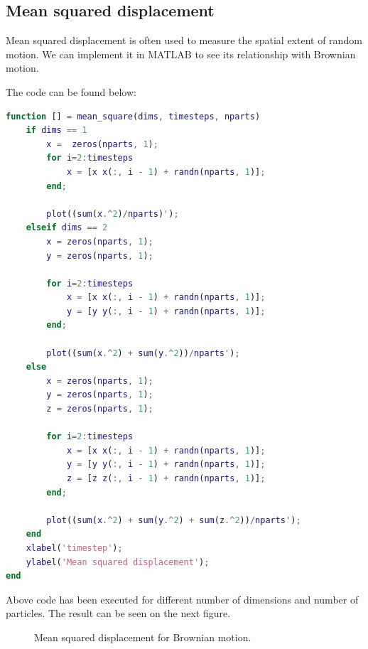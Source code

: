 \documentclass[12pt]{article}
\begin{document}
\subsection{Mean squared displacement}
Mean squared displacement is often used to measure the spatial extent of random motion. We can implement it in MATLAB to see its relationship with Brownian motion.

The code can be found below:

\begin{lstlisting}[language=Matlab, caption = {Source code for Mean squared displacement}]
function [] = mean_square(dims, timesteps, nparts)
	if dims == 1
		x =  zeros(nparts, 1);
		for i=2:timesteps
			x = [x x(:, i - 1) + randn(nparts, 1)];
		end;

		plot((sum(x.^2)/nparts)');
	elseif dims == 2
		x = zeros(nparts, 1);
		y = zeros(nparts, 1);

		for i=2:timesteps
			x = [x x(:, i - 1) + randn(nparts, 1)];
			y = [y y(:, i - 1) + randn(nparts, 1)];
		end;

		plot((sum(x.^2) + sum(y.^2))/nparts');
	else
		x = zeros(nparts, 1);
		y = zeros(nparts, 1);
		z = zeros(nparts, 1);

		for i=2:timesteps
			x = [x x(:, i - 1) + randn(nparts, 1)];
			y = [y y(:, i - 1) + randn(nparts, 1)];
			z = [z z(:, i - 1) + randn(nparts, 1)];
		end;

		plot((sum(x.^2) + sum(y.^2) + sum(z.^2))/nparts');
	end
	xlabel('timestep');
	ylabel('Mean squared displacement');
end
\end{lstlisting}

Above code has been executed for different number of dimensions and number of particles. The result can be seen on the next figure.

\begin{figure}[H]
	\centering
	\caption{Mean squared displacement for Brownian motion.}
\end{figure}
\end{document}
